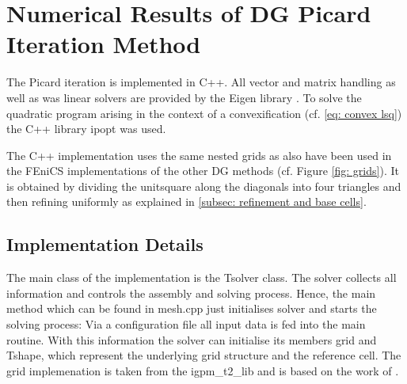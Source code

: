 
\newpage

\section{Numerical Results of DG Picard Iteration Method} \label{sec: numerical results our Method}

The Picard iteration is implemented in C++. All vector and matrix handling as well as was linear solvers are provided by the Eigen library \cite{eigenweb}. To solve the quadratic program arising in the context of a convexification (cf. \eqref{eq: convex lsq}) the C++ library ipopt \cite{ipopt} was used.

The C++ implementation uses the same nested grids as also have been used in the FEniCS implementations of the other DG methods (cf. Figure \ref{fig: grids}). It is obtained by dividing the unitsquare along the diagonals into four triangles and then refining uniformly as explained in \ref{subsec: refinement and base cells}.

\subsection{Implementation Details}

The main class of the implementation is the Tsolver class. The solver collects all information and controls the assembly and solving process.
Hence, the main method which can be found in mesh.cpp just initialises solver and starts the solving process: Via a configuration file all input data is fed into the main routine. With this information the solver can initialise its members grid and Tshape, which represent the underlying grid structure and the reference cell. 
The grid implemenation is taken from the igpm\_t2\_lib and is based on the work of \cite{BMV2009}.


